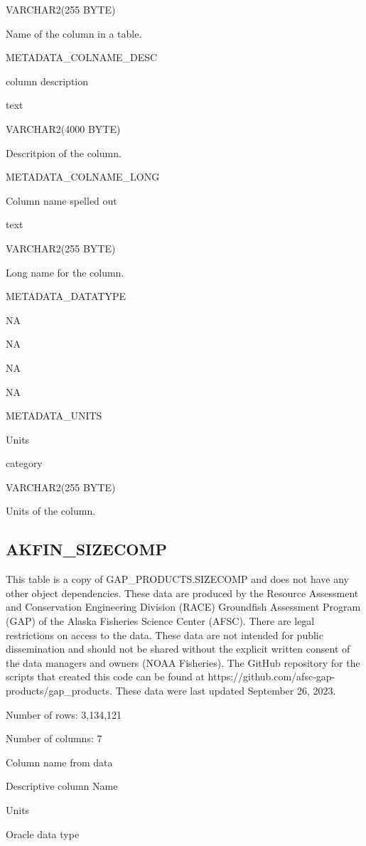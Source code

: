 \documentclass[
  letterpaper,
  oneside,
  open=any]{scrbook}
\begin{document}
VARCHAR2(255 BYTE)

Name of the column in a table.

METADATA\_COLNAME\_DESC

column description

text

VARCHAR2(4000 BYTE)

Descritpion of the column.

METADATA\_COLNAME\_LONG

Column name spelled out

text

VARCHAR2(255 BYTE)

Long name for the column.

METADATA\_DATATYPE

NA

NA

NA

NA

METADATA\_UNITS

Units

category

VARCHAR2(255 BYTE)

Units of the column.

\hypertarget{akfin_sizecomp}{%
\subsection{AKFIN\_SIZECOMP}\label{akfin_sizecomp}}

This table is a copy of GAP\_PRODUCTS.SIZECOMP and does not have any
other object dependencies. These data are produced by the Resource
Assessment and Conservation Engineering Division (RACE) Groundfish
Assessment Program (GAP) of the Alaska Fisheries Science Center (AFSC).
There are legal restrictions on access to the data. These data are not
intended for public dissemination and should not be shared without the
explicit written consent of the data managers and owners (NOAA
Fisheries). The GitHub repository for the scripts that created this code
can be found at https://github.com/afsc-gap-products/gap\_products.
These data were last updated September 26, 2023.

Number of rows: 3,134,121

Number of columns: 7

Column name from data

Descriptive column Name

Units

Oracle data type
\end{document}
